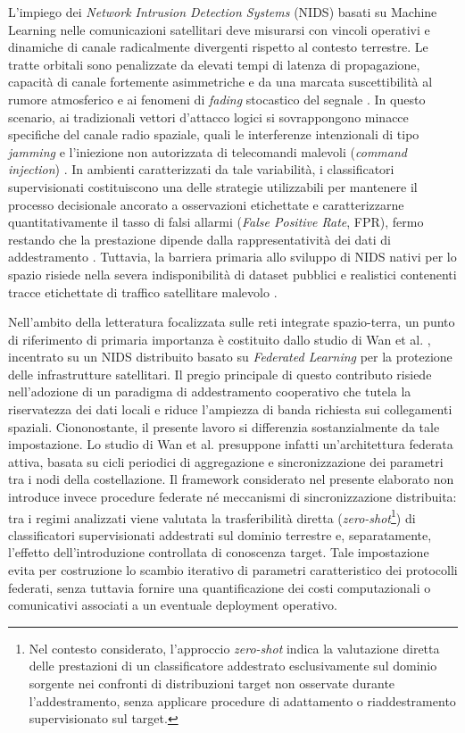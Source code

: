 L'impiego dei \textit{Network Intrusion Detection Systems} (NIDS) basati su Machine Learning nelle comunicazioni satellitari deve misurarsi con vincoli operativi e dinamiche di canale radicalmente divergenti rispetto al contesto terrestre. 
Le tratte orbitali sono penalizzate da elevati tempi di latenza di propagazione, capacità di canale fortemente asimmetriche e da una marcata suscettibilità al rumore atmosferico e ai fenomeni di \textit{fading} stocastico del segnale \cite{kodheli2021}. 
In questo scenario, ai tradizionali vettori d'attacco logici si sovrappongono minacce specifiche del canale radio spaziale, quali le interferenze intenzionali di tipo \textit{jamming} e l'iniezione non autorizzata di telecomandi malevoli (\textit{command injection}) \cite{nist2022}. 
In ambienti caratterizzati da tale variabilità, i classificatori supervisionati costituiscono una delle strategie utilizzabili per mantenere il processo decisionale ancorato a osservazioni etichettate e caratterizzarne quantitativamente il tasso di falsi allarmi (\textit{False Positive Rate}, FPR), fermo restando che la prestazione dipende dalla rappresentatività dei dati di addestramento \cite{khraisat2019, kodheli2021}. 
Tuttavia, la barriera primaria allo sviluppo di NIDS nativi per lo spazio risiede nella severa indisponibilità di dataset pubblici e realistici contenenti tracce etichettate di traffico satellitare malevolo \cite{azar2023}.

Nell'ambito della letteratura focalizzata sulle reti integrate spazio-terra, un punto di riferimento di primaria importanza è costituito dallo studio di Wan et al. \cite{wan2025}, incentrato su un NIDS distribuito basato su \textit{Federated Learning} per la protezione delle infrastrutture satellitari. 
Il pregio principale di questo contributo risiede nell'adozione di un paradigma di addestramento cooperativo che tutela la riservatezza dei dati locali e riduce l'ampiezza di banda richiesta sui collegamenti spaziali. 
Ciononostante, il presente lavoro si differenzia sostanzialmente da tale impostazione. 
Lo studio di Wan et al. presuppone infatti un'architettura federata attiva, basata su cicli periodici di aggregazione e sincronizzazione dei parametri tra i nodi della costellazione. 
Il framework considerato nel presente elaborato non introduce invece procedure federate né meccanismi di sincronizzazione distribuita: tra i regimi analizzati viene valutata la trasferibilità diretta (\textit{zero-shot}\footnote{Nel contesto considerato, l'approccio \textit{zero-shot} indica la valutazione diretta delle prestazioni di un classificatore addestrato esclusivamente sul dominio sorgente nei confronti di distribuzioni target non osservate durante l'addestramento, senza applicare procedure di adattamento o riaddestramento supervisionato sul target.}) di classificatori supervisionati addestrati sul dominio terrestre e, separatamente, l'effetto dell'introduzione controllata di conoscenza target. 
Tale impostazione evita per costruzione lo scambio iterativo di parametri caratteristico dei protocolli federati, senza tuttavia fornire una quantificazione dei costi computazionali o comunicativi associati a un eventuale deployment operativo. 

